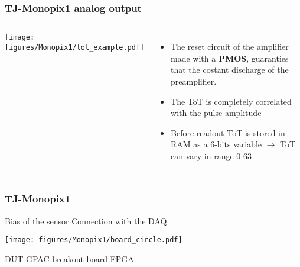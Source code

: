     \begin{frame}
        \frametitle{TJ-Monopix1 analog output}
        \begin{columns}
                \hspace*{-0.5cm} 
                \texttt{[image: figures/Monopix1/tot\_example.pdf]}
                \begin{itemize}
                    \item The reset circuit of the amplifier made with a \textbf{PMOS}, guaranties that the costant discharge of the preamplifier. 
                    \item The ToT is completely correlated with the pulse amplitude 
                    \item Before readout ToT is stored in RAM as a 6-bits variable $\rightarrow$ ToT can vary in range 0-63
                \end{itemize}
        \end{columns}
    \end{frame} 



    \begin{frame}
        \frametitle{TJ-Monopix1}
            Bias of the sensor\hspace{80pt} Connection with the DAQ
            \begin{center}
                \centering \texttt{[image: figures/Monopix1/board\_circle.pdf]}
            \end{center}
            \hspace{15pt}DUT \hspace{45pt}GPAC breakout board \hspace{25pt} FPGA\\
    \end{frame} 
 







